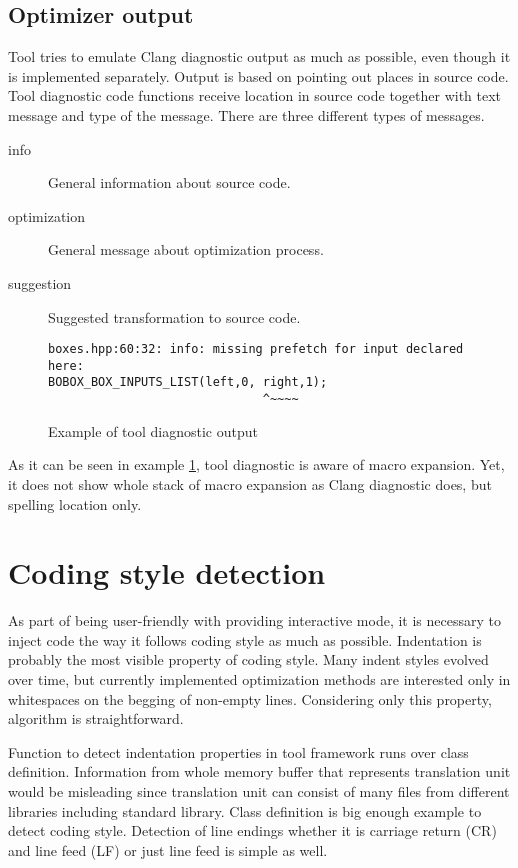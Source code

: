 \subsection{Optimizer output}
Tool tries to emulate Clang diagnostic output as much as possible, even though it is implemented separately. Output is based on pointing out places in source code. Tool diagnostic code functions receive location in source code together with text message and type of the message. There are three different types of messages.

\begin{description}
\item[info]{General information about source code.}
\item[optimization]{General message about optimization process.}
\item[suggestion]{Suggested transformation to source code.}
\end{description}

\begin{figure}[h!]
\caption{Example of tool diagnostic output}
\label{modes-output}
\begin{verbatim}
boxes.hpp:60:32: info: missing prefetch for input declared here:
BOBOX_BOX_INPUTS_LIST(left,0, right,1);
                              ^~~~~
\end{verbatim}
\end{figure}

As it can be seen in example \ref{modes-output}, tool diagnostic is aware of macro expansion. Yet, it does not show whole stack of macro expansion as Clang diagnostic does, but spelling location only.

\section{Coding style detection}
As part of being user-friendly with providing interactive mode, it is necessary to inject code the way it follows coding style as much as possible. Indentation is probably the most visible property of coding style. Many indent styles evolved over time, but currently implemented optimization methods are interested only in whitespaces on the begging of non-empty lines. Considering only this property, algorithm is straightforward.

Function to detect indentation properties in tool framework runs over class definition. Information from whole memory buffer that represents translation unit would be misleading since translation unit can consist of many files from different libraries including standard library. Class definition is big enough example to detect coding style. Detection of line endings whether it is carriage return (CR) and line feed (LF) or just line feed is simple as well.

